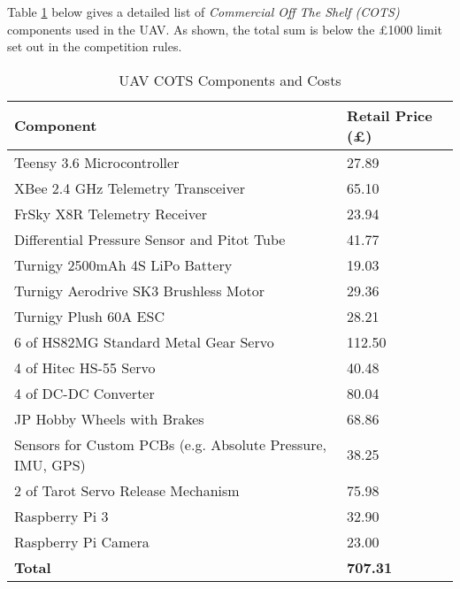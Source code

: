 Table \ref{tab:cots} below gives a detailed list of \textit{Commercial Off The Shelf (COTS)} components used in the UAV. As shown, the total sum is below the \pounds 1000 limit set out in the competition rules.

\begin{table}[h]
\centering
\begin{tabular}{p{}|>{\hfill}p{}} 
\textbf{Component} & \textbf{Retail Price (\pounds)} \\ \hline
Teensy 3.6 Microcontroller & 27.89 \\ \hline
XBee 2.4 GHz Telemetry Transceiver & 65.10 \\ \hline
FrSky X8R Telemetry Receiver & 23.94 \\ \hline
Differential Pressure Sensor and Pitot Tube & 41.77 \\ \hline
Turnigy 2500mAh 4S LiPo Battery & 19.03 \\ \hline
Turnigy Aerodrive SK3 Brushless Motor & 29.36 \\ \hline
Turnigy Plush 60A ESC & 28.21 \\ \hline
6 of HS82MG Standard Metal Gear Servo & 112.50 \\ \hline
4 of Hitec HS-55 Servo & 40.48 \\ \hline
4 of DC-DC Converter & 80.04 \\ \hline
JP Hobby Wheels with Brakes & 68.86 \\ \hline
Sensors for Custom PCBs (e.g. Absolute Pressure, IMU, GPS) & 38.25 \\ \hline 
2 of Tarot Servo Release Mechanism & 75.98 \\ \hline
Raspberry Pi 3 & 32.90 \\ \hline
Raspberry Pi Camera & 23.00 \\ \hline
\textbf{Total} & \textbf{707.31} \\
\end{tabular}
\caption{UAV COTS Components and Costs}
\label{tab:cots}
\end{table}
